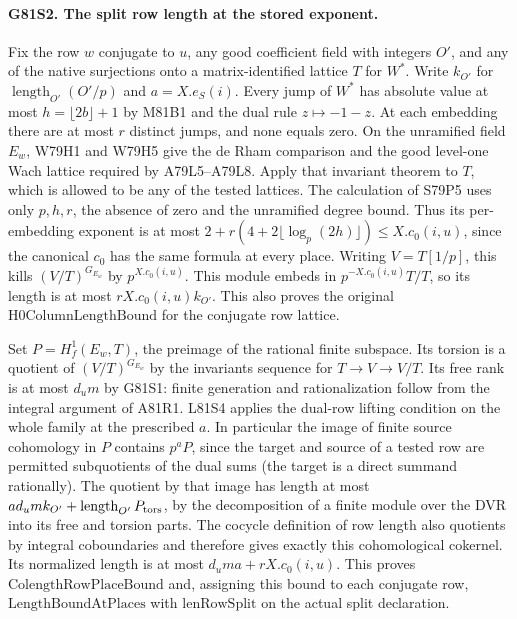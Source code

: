 \paragraph{G81S2. The split row length at the stored exponent.}
Fix the row $w$ conjugate to $u$, any good coefficient field with
integers $O'$, and any of the native surjections onto a
matrix-identified lattice $T$ for $W^*$. Write $k_{O'}$ for
$\operatorname{length}_{O'}(O'/p)$ and $a=X.e_S(i)$.
Every jump of $W^*$ has absolute value at most
$h=\lfloor2b\rfloor+1$ by M81B1 and the dual rule $z\mapsto-1-z$.
At each embedding there are at most $r$ distinct jumps, and none
equals zero. On the unramified field $E_w$, W79H1 and W79H5 give
the de Rham comparison and the good level-one Wach lattice
required by A79L5--A79L8. Apply that invariant theorem to $T$,
which is allowed to be any of the tested lattices. The calculation
of S79P5 uses only $p,h,r$, the absence of zero and the unramified
degree bound. Thus its per-embedding exponent is at most
$2+r(4+2\lfloor\log_p(2h)\rfloor)\le X.c_0(i,u)$, since
the canonical $c_0$ has the same formula at every place. Writing
$V=T[1/p]$, this kills $(V/T)^{G_{E_w}}$ by $p^{X.c_0(i,u)}$.
This module embeds in $p^{-X.c_0(i,u)}T/T$, so its length is at
most $r X.c_0(i,u) k_{O'}$. This also proves the original
$\mathrm{H0ColumnLengthBound}$ for the conjugate row lattice.

Set $P=H^1_f(E_w,T)$, the preimage of the rational finite
subspace. Its torsion is a quotient of $(V/T)^{G_{E_w}}$ by
the invariants sequence for $T\to V\to V/T$. Its free rank
is at most $d_um$ by G81S1: finite generation and
rationalization follow from the integral argument of A81R1.
L81S4 applies the dual-row lifting condition on the whole
family at the prescribed $a$. In particular the image of
finite source cohomology in $P$ contains $p^aP$, since the
target and source of a tested row are permitted subquotients
of the dual sums (the target is a direct summand rationally).
The quotient by that image has length at most
$a d_um k_{O'}+\operatorname{length}_{O'}P_{\rm tors}$,
by the decomposition of a finite module over the DVR into its
free and torsion parts. The cocycle definition of row length
also quotients by integral coboundaries and therefore gives
exactly this cohomological cokernel. Its normalized length is
at most $d_um a+rX.c_0(i,u)$. This proves
$\mathrm{ColengthRowPlaceBound}$ and, assigning this bound to
each conjugate row, $\mathrm{LengthBoundAtPlaces}$ with
$\mathrm{lenRowSplit}$ on the actual split declaration.

